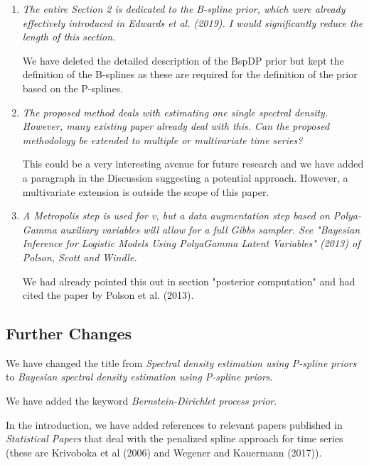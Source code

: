 \documentclass{scrartcl}
\newcommand{\refereeQuote}{\textit }
\newcommand{\response}{}
\begin{document}
\begin{enumerate}
\item
\refereeQuote{The entire Section 2 is dedicated to the B-spline prior, which were already effectively introduced in Edwards et al. (2019). I would significantly reduce the length of this section.}\smallskip

\response{We have deleted the detailed description of the BspDP prior but kept the definition of the B-splines as these are required for the definition of the prior based on the  P-splines.}\bigskip

\item 
\refereeQuote{The proposed method deals with estimating one single spectral density. However, many existing paper already deal with this. Can the proposed methodology be extended to multiple or multivariate time series?}\smallskip

\response{
 This could be a
very interesting avenue for future research and we have added a paragraph in the Discussion suggesting a potential approach. However, a multivariate extension is outside the scope of this paper.}\bigskip

\item
\refereeQuote{A Metropolis step is used for v, but a data augmentation step based on Polya-Gamma auxiliary variables will allow for a full Gibbs sampler. See "Bayesian Inference for Logistic Models Using PolyaGamma Latent Variables" (2013) of Polson, Scott and Windle.}\smallskip

\response{We had already pointed this out in section "posterior computation" and had cited the paper by Polson et al. (2013).}

\end{enumerate}


\subsection*{Further Changes}


We have changed the title from {\em Spectral density estimation using P-spline priors} to {\em Bayesian spectral density estimation using P-spline priors}.\smallskip

We have added the keyword {\em Bernstein-Dirichlet process prior}.\smallskip

In the introduction, we have added references to relevant papers published in {\em Statistical Papers} that deal with the penalized spline approach for time series (these are Krivoboka et al (2006) and Wegener and Kauermann (2017)).
\end{document}
